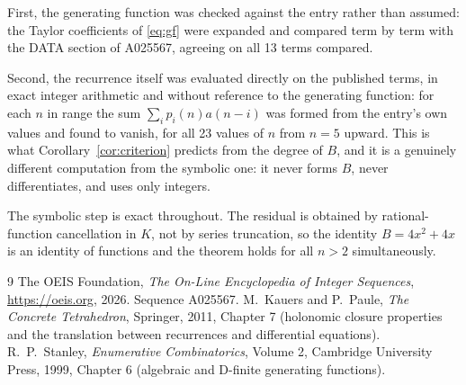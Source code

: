 \documentclass[11pt,a4paper]{article}
\theoremstyle{plain}
\theoremstyle{definition}
\begin{document}
First, the generating function was checked against the entry rather than assumed: the
Taylor coefficients of \eqref{eq:gf} were expanded and compared term by term with the DATA
section of A025567, agreeing on all 13 terms compared.

Second, the recurrence itself was evaluated directly on the published terms, in exact
integer arithmetic and without reference to the generating function: for each $n$ in range
the sum $\sum_{i}p_{i}(n)a(n-i)$ was formed from the entry's own values and found to
vanish, for all 23 values of $n$ from $n=5$ upward. This is what
Corollary~\ref{cor:criterion} predicts from the degree of $B$, and it is a genuinely
different computation from the symbolic one: it never forms $B$, never differentiates, and
uses only integers.

The symbolic step is exact throughout. The residual is obtained by rational-function
cancellation in $K$, not by series truncation, so the identity $B=4 x^{2} + 4 x$ is an
identity of functions and the theorem holds for all $n>2$ simultaneously.

\begin{thebibliography}{9}
 The OEIS Foundation, \emph{The On-Line Encyclopedia of Integer Sequences},
\url{https://oeis.org}, 2026. Sequence A025567.
 M.~Kauers and P.~Paule, \emph{The Concrete Tetrahedron}, Springer, 2011,
Chapter 7 (holonomic closure properties and the translation between recurrences and
differential equations).
 R.~P.~Stanley, \emph{Enumerative Combinatorics}, Volume 2, Cambridge
University Press, 1999, Chapter 6 (algebraic and D-finite generating functions).
\end{thebibliography}
\end{document}
